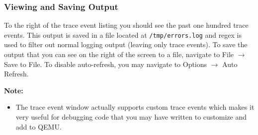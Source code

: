 \documentclass{article}
\newcommand{\code}[1]{\texttt{#1}}
\begin{document}
\subsubsection{Viewing and Saving Output}
To the right of the trace event listing you should see the past one hundred trace events. This output is saved in a file located at \code{/tmp/errors.log} and regex is used to filter out normal logging output (leaving only trace events). 
To save the output that you can see on the right of the screen to a file, navigate to File $\rightarrow$ Save to File. To disable auto-refresh, you may navigate to Options $\rightarrow$ Auto Refresh. \newline

\textbf{Note:}
\begin{itemize}
    \item The trace event window actually supports custom trace events which makes it very useful for debugging code that you may have written to customize and add to QEMU.
\end{itemize}
\end{document}
